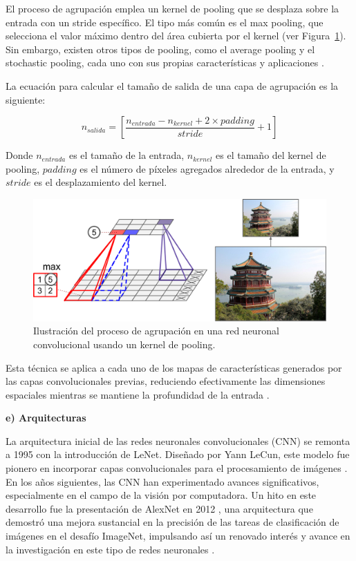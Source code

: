 El proceso de agrupación emplea un kernel de pooling que se desplaza sobre la entrada con un stride específico. El tipo más común es el max pooling, que selecciona el valor máximo dentro del área cubierta por el kernel (ver Figura~\ref{fig:2-pooling}). Sin embargo, existen otros tipos de pooling, como el average pooling y el stochastic pooling, cada uno con sus propias características y aplicaciones \cite{scherer2010evaluation, zeiler2013stochastic}.

La ecuación para calcular el tamaño de salida de una capa de agrupación es la siguiente:

\begin{equation}
    \label{ecu:pooling_output}
    n_{salida} = \left[ \frac{n_{entrada} - n_{kernel} + 2 \times padding}{stride} + 1 \right]
\end{equation}

Donde \( n_{entrada} \) es el tamaño de la entrada, \( n_{kernel} \) es el tamaño del kernel de pooling, \( padding \) es el número de píxeles agregados alrededor de la entrada, y \( stride \) es el desplazamiento del kernel.

\begin{figure}[H]
    \begin{center}
        \includegraphics[width=\textwidth]{Images/2-pooling.png}
    \end{center}
    \caption{Ilustración del proceso de agrupación en una red neuronal convolucional usando un kernel de pooling.}
    \label{fig:2-pooling}
\end{figure}

Esta técnica se aplica a cada uno de los mapas de características generados por las capas convolucionales previas, reduciendo efectivamente las dimensiones espaciales mientras se mantiene la profundidad de la entrada \cite{geron2019hands}.

\textbf{e) Arquitecturas}

La arquitectura inicial de las redes neuronales convolucionales (CNN) se remonta a 1995 con la introducción de LeNet. Diseñado por Yann LeCun, este modelo fue pionero en incorporar capas convolucionales para el procesamiento de imágenes \cite{lecun1998gradient}. En los años siguientes, las CNN han experimentado avances significativos, especialmente en el campo de la visión por computadora. Un hito en este desarrollo fue la presentación de AlexNet en 2012 \cite{krizhevsky2012imagenet}, una arquitectura que demostró una mejora sustancial en la precisión de las tareas de clasificación de imágenes en el desafío ImageNet, impulsando así un renovado interés y avance en la investigación en este tipo de redes neuronales \cite{alom2018history}.

